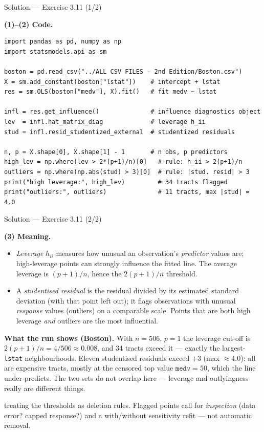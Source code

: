 \documentclass[aspectratio=169,11pt]{beamer}
\begin{document}
\begin{frame}[fragile]{Solution --- Exercise 3.11 (1/2)}
  \begin{solutionbox}
    \textbf{(1)--(2) Code.}
    \vspace{-2mm}
\begin{lstlisting}
import pandas as pd, numpy as np
import statsmodels.api as sm

boston = pd.read_csv("../ALL CSV FILES - 2nd Edition/Boston.csv")
X = sm.add_constant(boston["lstat"])    # intercept + lstat
res = sm.OLS(boston["medv"], X).fit()   # fit medv ~ lstat

infl = res.get_influence()              # influence diagnostics object
lev  = infl.hat_matrix_diag             # leverage h_ii
stud = infl.resid_studentized_external  # studentized residuals

n, p = X.shape[0], X.shape[1] - 1       # n obs, p predictors
high_lev = np.where(lev > 2*(p+1)/n)[0]   # rule: h_ii > 2(p+1)/n
outliers = np.where(np.abs(stud) > 3)[0]  # rule: |stud. resid| > 3
print("high leverage:", high_lev)         # 34 tracts flagged
print("outliers:", outliers)              # 11 tracts, max |stud| = 4.0
\end{lstlisting}
  \end{solutionbox}
\end{frame}

\begin{frame}{Solution --- Exercise 3.11 (2/2)}
  \begin{solutionbox}
    \textbf{(3) Meaning.}
    \begin{itemize}
      \item \emph{Leverage} $h_{ii}$ measures how unusual an
            observation's \emph{predictor} values are; high-leverage
            points can strongly influence the fitted line. The average
            leverage is $(p+1)/n$, hence the $2(p+1)/n$ threshold.
      \item A \emph{studentised residual} is the residual divided by its
            estimated standard deviation (with that point left out); it
            flags observations with unusual \emph{response} values
            (outliers) on a comparable scale. Points that are both high
            leverage \emph{and} outliers are the most influential.
    \end{itemize}

    \textbf{What the run shows (Boston).} With $n=506$, $p=1$ the
    leverage cut-off is $2(p+1)/n=4/506\approx 0.008$, and $34$ tracts
    exceed it --- exactly the largest-\texttt{lstat} neighbourhoods.
    Eleven studentised residuals exceed $+3$ (max $\approx 4.0$): all
    are expensive tracts, mostly at the censored top value
    $\texttt{medv}=50$, which the line under-predicts. The two sets do
    not overlap here --- leverage and outlyingness really are different
    things.
  \end{solutionbox}
  \begin{mistake}
    treating the thresholds as deletion rules.
    Flagged points call for \emph{inspection} (data error? capped
    response?) and a with/without sensitivity refit --- not automatic
    removal.
  \end{mistake}
\end{frame}
\end{document}
